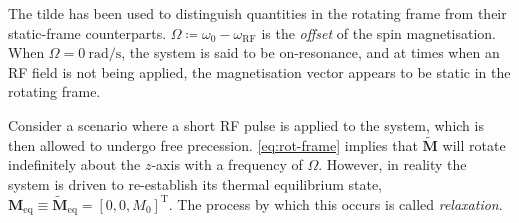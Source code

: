 The tilde has been used to distinguish quantities in the rotating frame from
their static-frame counterparts.
$\Omega \coloneq \omega_0 - \omega_{\text{RF}}$ is the \emph{offset} of the spin
magnetisation. When $\Omega = \qty{0}{\radian\per\second}$, the system is said to
be on-resonance, and at times when an \ac{RF} field is not being applied, the
magnetisation vector appears to be static in the rotating frame.

Consider a scenario where a short \ac{RF} pulse is applied to the system, which
is then allowed to undergo free precession. \cref{eq:rot-frame} implies that
$\tilde{\symbf{M}}$ will rotate indefinitely about the $z$-axis with a
frequency of $\Omega$. However, in reality the system is driven to re-establish
its thermal equilibrium state, $\symbf{M}_{\text{eq}} \equiv
\tilde{\symbf{M}}_{\text{eq}} = [0, 0, M_0]^{\mathrm{T}}$. The process by which
this occurs is called \emph{relaxation}.
